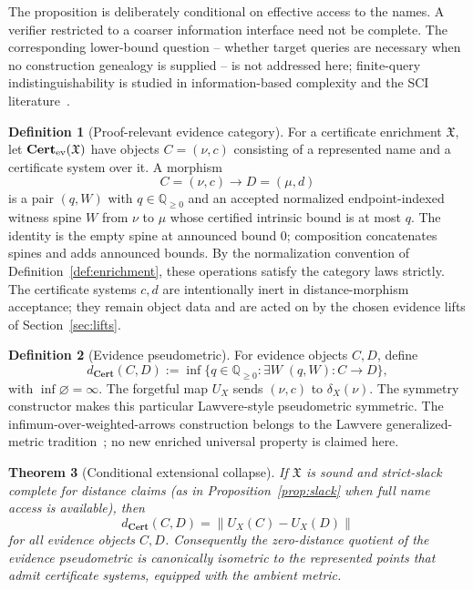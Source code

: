 \documentclass[11pt]{article}
\newtheorem{theorem}{Theorem}[section]
\theoremstyle{definition}
\newtheorem{definition}[theorem]{Definition}
\newcommand{\norm}[1]{\left\lVert #1 \right\rVert}
\newcommand{\Q}{\mathbb{Q}}
\newcommand{\Cert}{\mathbf{Cert}}
\begin{document}
The proposition is deliberately conditional on effective access to the names.  A verifier
restricted to a coarser information interface need not be complete.  The corresponding
lower-bound question -- whether target queries are necessary when no construction genealogy
is supplied -- is not addressed here; finite-query indistinguishability is studied in
information-based complexity and the SCI literature~\cite{TWW,ColbrookHansen,Sorg2026}.

\begin{definition}[Proof-relevant evidence category]\label{def:evcat}
For a certificate enrichment $\mathfrak X$, let $\Cert_{\rm ev}(\mathfrak X)$ have
objects $C=(\nu,c)$ consisting of a represented name and a certificate system over it.
A morphism
\[
 C=(\nu,c)\longrightarrow D=(\mu,d)
\]
is a pair $(q,W)$ with $q\in\Q_{\ge0}$ and an accepted normalized endpoint-indexed
witness spine $W$ from $\nu$ to $\mu$ whose certified intrinsic bound is at most $q$.
The identity is the empty spine at announced bound $0$; composition concatenates spines
and adds announced bounds.  By the normalization convention of
Definition~\ref{def:enrichment}, these operations satisfy the category laws strictly.
The certificate systems $c,d$ are intentionally inert in distance-morphism acceptance;
they remain object data and are acted on by the chosen evidence lifts of Section~\ref{sec:lifts}.
\end{definition}

\begin{definition}[Evidence pseudometric]\label{def:evmetric}
For evidence objects $C,D$, define
\[
 d_{\Cert}(C,D)
 :=\inf\{q\in\Q_{\ge0}:\exists W\;(q,W):C\to D\},
\]
with $\inf\varnothing=\infty$.  The forgetful map $U_X$ sends $(\nu,c)$ to
$\delta_X(\nu)$.  The symmetry constructor makes this particular Lawvere-style
pseudometric symmetric.  The infimum-over-weighted-arrows construction belongs to the
Lawvere generalized-metric tradition~\cite{Lawvere73}; no new enriched universal
property is claimed here.
\end{definition}

\begin{theorem}[Conditional extensional collapse]\label{thm:collapse}
If $\mathfrak X$ is sound and strict-slack complete for distance claims (as in Proposition~\ref{prop:slack} when full name access is available), then
\[
 d_{\Cert}(C,D)=\norm{U_X(C)-U_X(D)}
\]
for all evidence objects $C,D$.  Consequently the zero-distance quotient of the evidence
pseudometric is canonically isometric to the represented points that admit certificate
systems, equipped with the ambient metric.
\end{theorem}
\end{document}
